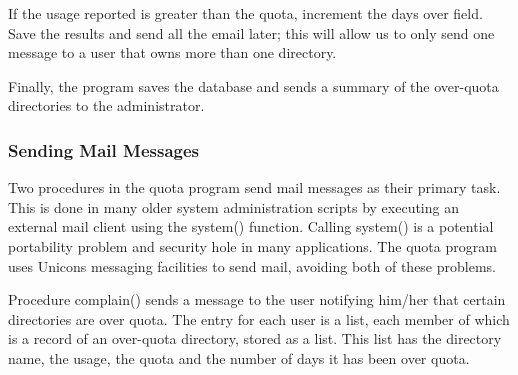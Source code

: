 If the usage reported is greater than the quota, increment the
{\textquotedbl}days over{\textquotedbl} field. Save the results and
send all the email later; this will allow us to only send one message
to a user that owns more than one directory. 


Finally, the program saves the database and sends a summary of the
over-quota directories to the administrator. 


\subsubsection{Sending Mail Messages}

Two procedures in the quota program send mail messages as their primary
task. This is done in many older system administration scripts by
executing an external mail client using the \textsf{system()} function.
Calling \textsf{system()} is a potential portability
problem and security hole in many applications. The quota program uses
Unicon{\textquotesingle}s messaging facilities to send mail, avoiding
both of these problems.

Procedure \textsf{complain()} sends a message to the user notifying
him/her that certain directories are over quota. The entry for each
user is a list, each member of which is a record of an over-quota
directory, stored as a list. This list has the directory name, the
usage, the quota and the number of days it has been over quota.


